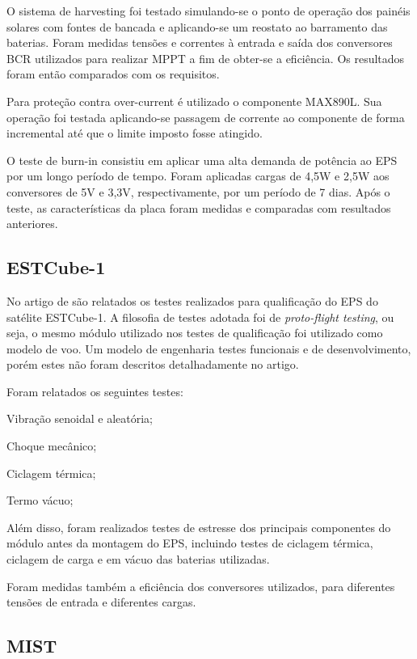 O sistema de harvesting foi testado simulando-se o ponto de operação dos painéis solares com fontes de bancada e aplicando-se um reostato ao barramento das baterias. Foram medidas tensões e correntes à entrada e saída dos conversores \gls{BCR} utilizados para realizar \gls{MPPT} a fim de obter-se a eficiência.
Os resultados foram então comparados com os requisitos.

Para proteção contra over-current é utilizado o componente MAX890L. Sua operação foi testada aplicando-se passagem de corrente ao componente de forma incremental até que o limite imposto fosse atingido.

O teste de burn-in consistiu em aplicar uma alta demanda de potência ao EPS por um longo período de tempo.
Foram aplicadas cargas de 4,5W e 2,5W aos conversores de 5V e 3,3V, respectivamente, por um período de 7 dias. Após o teste, as características da placa foram medidas e comparadas com resultados anteriores.

\subsection{ESTCube-1}

No artigo de \textcite{estcube-eps} são relatados os testes realizados para qualificação do \gls{EPS} do satélite ESTCube-1. A filosofia de testes adotada foi de \textit{proto-flight testing}, ou seja, o mesmo módulo utilizado nos testes de qualificação foi utilizado como modelo de voo.
Um modelo de engenharia testes funcionais e de desenvolvimento, porém estes não foram descritos detalhadamente no artigo.

Foram relatados os seguintes testes:
\begin{alineas}
    \item Vibração senoidal e aleatória;
    \item Choque mecânico;
    \item Ciclagem térmica;
    \item Termo vácuo;
\end{alineas}

Além disso, foram realizados testes de estresse dos principais componentes do módulo antes da montagem do \gls{EPS}, incluindo testes de ciclagem térmica, ciclagem de carga e em vácuo das baterias utilizadas.

Foram medidas também a eficiência dos conversores utilizados, para diferentes tensões de entrada e diferentes cargas.


\subsection{MIST}

